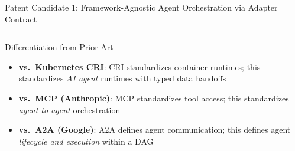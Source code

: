 \begin{frame}{\fontsize{9}{11}\selectfont Patent Candidate 1: Framework-Agnostic Agent Orchestration via Adapter Contract}
\begin{columns}[T]
    \begin{exampleblock}{\fontsize{5.5}{6.5}\selectfont Differentiation from Prior Art}
      \fontsize{5.5}{6.5}\selectfont
      \begin{itemize}
        \setlength{\itemsep}{0pt}
        \item \textbf{vs.\ Kubernetes CRI}: CRI standardizes container runtimes;
              this standardizes \emph{AI agent} runtimes with typed data handoffs
        \item \textbf{vs.\ MCP (Anthropic)}: MCP standardizes tool access;
              this standardizes \emph{agent-to-agent} orchestration
        \item \textbf{vs.\ A2A (Google)}: A2A defines agent communication;
              this defines agent \emph{lifecycle and execution} within a DAG
      \end{itemize}
    \end{exampleblock}
  \end{columns}
\end{frame}


